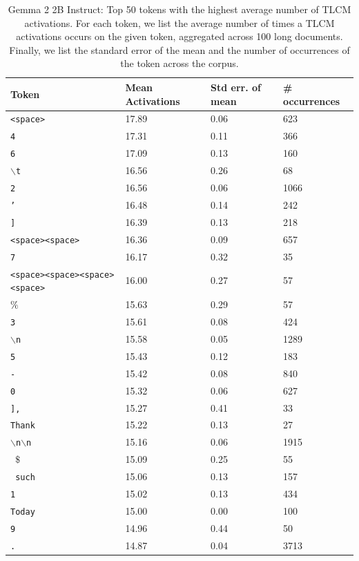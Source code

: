 \begin{table}[h!]
\centering
\caption{Gemma 2 2B Instruct: Top 50 tokens with the highest average number of TLCM activations. For each token, we list the average number of times a TLCM activations occurs on the given token, aggregated across 100 long documents. Finally, we list the standard error of the mean and the number of occurrences of the token across the corpus.}
\label{table:token_correction_counts_gemma_top}
\begin{tabular}{llll}
\toprule
\textbf{Token} & \textbf{Mean Activations} & \textbf{Std err. of mean} & \textbf{\# occurrences} \\
\midrule
\texttt{<space>} & 17.89 & 0.06 & 623 \\
\texttt{4} & 17.31 & 0.11 & 366 \\
\texttt{6} & 17.09 & 0.13 & 160 \\
\texttt{$\backslash$t} & 16.56 & 0.26 & 68 \\
\texttt{2} & 16.56 & 0.06 & 1066 \\
\texttt{'} & 16.48 & 0.14 & 242 \\
\texttt{]} & 16.39 & 0.13 & 218 \\
\texttt{<space><space>} & 16.36 & 0.09 & 657 \\
\texttt{7} & 16.17 & 0.32 & 35 \\
\texttt{<space><space><space><space>} & 16.00 & 0.27 & 57 \\
\texttt{$\%$} & 15.63 & 0.29 & 57 \\
\texttt{3} & 15.61 & 0.08 & 424 \\
\texttt{$\backslash$n} & 15.58 & 0.05 & 1289 \\
\texttt{5} & 15.43 & 0.12 & 183 \\
\texttt{-} & 15.42 & 0.08 & 840 \\
\texttt{0} & 15.32 & 0.06 & 627 \\
\texttt{],} & 15.27 & 0.41 & 33 \\
\texttt{Thank} & 15.22 & 0.13 & 27 \\
\texttt{$\backslash$n$\backslash$n} & 15.16 & 0.06 & 1915 \\
\texttt{ $\$$} & 15.09 & 0.25 & 55 \\
\texttt{ such} & 15.06 & 0.13 & 157 \\
\texttt{1} & 15.02 & 0.13 & 434 \\
\texttt{Today} & 15.00 & 0.00 & 100 \\
\texttt{9} & 14.96 & 0.44 & 50 \\
\texttt{.} & 14.87 & 0.04 & 3713 \\

\end{tabular}
\end{table}

